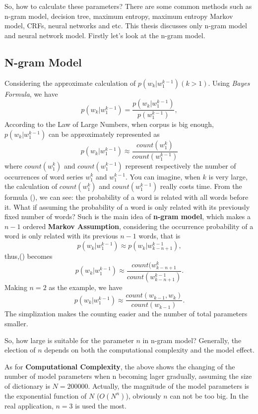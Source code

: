 So, how to calculate these parameters? There are some common methods such as n-gram model, decision tree, maximum entropy, maximum entropy Markov model, CRFs, neural networks and etc. This thesis discusses only n-gram model and neural network model. Firstly let's look at the n-gram model.

\subsection{N-gram Model}
Considering the approximate calculation of $p(w_k|w^{k-1}_1) (k > 1)$. Using \emph{Bayes Formula}, we have
$$ p(w_k|w^{k-1}_1)=\frac{p(w_k|w^{k-1}_1)}{p(w^{k-1}_1)},$$
According to the Law of Large Numbers, when corpus is big enough, $p(w_k|w^{k-1}_1)$ can be approximately represented as
\begin{equation}
p(w_k|w^{k-1}_1)\approx \frac{count(w^k_1)}{count(w^{k-1}_1)}
\end{equation}
where $count(w^k_1)$ and $count(w^{k-1}_1)$ represent respectively the number of occurrences of word series $w^k_1$ and $w^{k-1}_1$. You can imagine, when $k$ is very large, the calculation of $count(w^k_1)$ and $count(w^{k-1}_1)$ really costs time. 
From the formula (), we can see: the probability of a word is related with all words before it. What if assuming the probability of a word is only related with its previously fixed number of words? Such is the main idea of \textbf{n-gram model}, which makes a $n-1$ ordered \textbf{Markov Assumption}, considering the occurrence probability of a word is only related with its previous $n-1$ words, that is 
$$p(w_k|w^{k-1}_1)\approx p(w_k|w^{k-1}_{k-n+1}),$$
thus,() becomes 
$$p(w_k|w^{k-1}_1)\approx \frac{count(w^k_{k-n+1}}{count(w^{k-1}_{k-n+1})}.$$
Making $n=2$ as the example, we have
$$p(w_k|w^{k-1}_1)\approx \frac{count(w_{k-1},w_k)}{count(w_{k-1})}.$$
The simplization makes the counting easier and the number of total parameters smaller.

So, how large is suitable for the parameter $n$ in n-gram model? Generally,  the election of $n$ depends on both the computational complexity and the model effect. 

As for \textbf{Computational Complexity}, the above shows the changing of  the number of model parameters when n becoming lager gradually, assuming the size of dictionary is $N = 200000$. Actually, the magnitude of the model parameters is the exponential function of $N$ ($O(N^n)$), obviously $n$ can not be too big. In the real application, $n=3$ is used the most.

